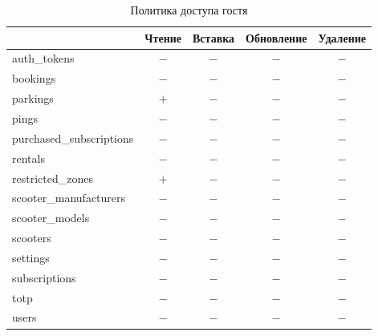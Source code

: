 \begin{table}[H]
	\begin{threeparttable}[b]
		\caption{Политика доступа гостя}
		\label{tbl:guest-policy}
		{\renewcommand{\arraystretch}{1.2}
			\begin{tabularx}{\textwidth}
				{
					| >{\raggedright\arraybackslash}X
					| >{\centering\arraybackslash}c
					| >{\centering\arraybackslash}c
					| >{\centering\arraybackslash}c
					| >{\centering\arraybackslash}c |
				}
				\hline
				                         & \textbf{Чтение} & \textbf{Вставка} & \textbf{Обновление} & \textbf{Удаление} \\
				\hline
				auth\_tokens             & $-$             & $-$              & $-$                 & $-$               \\
				\hline
				bookings                 & $-$             & $-$              & $-$                 & $-$               \\
				\hline
				parkings                 & $+$             & $-$              & $-$                 & $-$               \\
				\hline
				pings                    & $-$             & $-$              & $-$                 & $-$               \\
				\hline
				purchased\_subscriptions & $-$             & $-$              & $-$                 & $-$               \\
				\hline
				rentals                  & $-$             & $-$              & $-$                 & $-$               \\
				\hline
				restricted\_zones        & $+$             & $-$              & $-$                 & $-$               \\
				\hline
				scooter\_manufacturers   & $-$             & $-$              & $-$                 & $-$               \\
				\hline
				scooter\_models          & $-$             & $-$              & $-$                 & $-$               \\
				\hline
				scooters                 & $-$             & $-$              & $-$                 & $-$               \\
				\hline
				settings                 & $-$             & $-$              & $-$                 & $-$               \\
				\hline
				subscriptions            & $-$             & $-$              & $-$                 & $-$               \\
				\hline
				totp                     & $-$             & $-$              & $-$                 & $-$               \\
				\hline
				users                    & $-$             & $-$              & $-$                 & $-$               \\
				\hline
			\end{tabularx}}
	\end{threeparttable}
\end{table}

